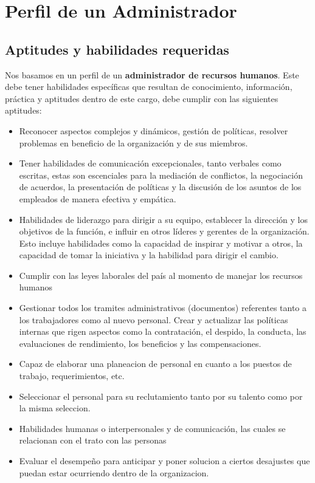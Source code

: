 \documentclass[letterpaper,12pt]{article}
\begin{document}
\begin{sloppypar}
\newpage
\section{\textcolor[rgb]{0.4,0.4,0.9}{Perfil de un Administrador}}
\subsection{Aptitudes y habilidades requeridas}
Nos basamos en un perfil de un \textbf{administrador de recursos humanos}. Este debe tener habilidades específicas que resultan de conocimiento, información, práctica y aptitudes dentro de este cargo, debe cumplir con las siguientes aptitudes:

\begin{itemize}
    \item Reconocer aspectos complejos y dinámicos, gestión de políticas, resolver problemas en beneficio de la organización y de sus miembros.
    \item Tener habilidades de comunicación excepcionales, tanto verbales como escritas, estas son escenciales para la mediación de conflictos, la negociación de acuerdos, la presentación de políticas y la discusión de los asuntos de los empleados de manera efectiva y empática.
    \item Habilidades de liderazgo para dirigir a su equipo, establecer la dirección y los objetivos de la función, e influir en otros líderes y gerentes de la organización. Esto incluye habilidades como la capacidad de inspirar y motivar a otros, la capacidad de tomar la iniciativa y la habilidad para dirigir el cambio.
    \item Cumplir con las leyes laborales del país al momento de manejar los recursos humanos
    \item Gestionar todos los tramites administrativos (documentos) referentes tanto a los trabajadores como al nuevo personal. Crear y actualizar las políticas internas que rigen aspectos como la contratación, el despido, la conducta, las evaluaciones de rendimiento, los beneficios y las compensaciones.
    \item Capaz de elaborar una planeacion de personal en cuanto a los puestos de trabajo, requerimientos, etc.
    \item Seleccionar el personal para su reclutamiento tanto por su talento como por la misma seleccion.
    \item Habilidades humanas o interpersonales y de comunicación, las cuales se relacionan con el trato con las personas
    \item Evaluar el desempeño para anticipar y poner solucion a ciertos desajustes que puedan estar ocurriendo dentro de la organizacion.

\end{itemize}
\end{sloppypar}
\end{document}
